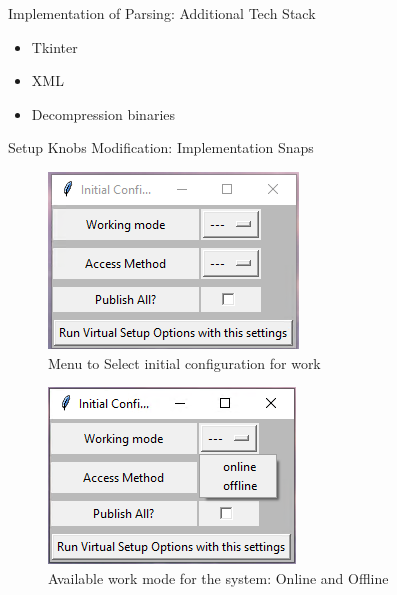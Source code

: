 \begin{frame}{Implementation of Parsing: Additional Tech Stack}
  \begin{itemize}
    \item Tkinter
    \item XML
    \item Decompression binaries
  \end{itemize}
\end{frame}

\begin{frame}[allowframebreaks]{Setup Knobs Modification: Implementation Snaps}
  \begin{figure}[htbp]
    \centering
    \includegraphics[width=0.6\linewidth]{Im/figures/proposed-work/bios-gui-initial-config}
    \caption{Menu to Select initial configuration for work}\label{fig:proposed-work-bios-gui-initial-config}
  \end{figure}
  
  \begin{figure}[htbp]
    \centering
    \includegraphics[width=0.6\linewidth]{Im/figures/proposed-work/bios-gui-initial-config-select-mode}
    \caption{Available work mode for the system: Online and Offline}\label{fig:proposed-work-bios-gui-initial-config-select-mode}
  \end{figure}
\end{frame}

